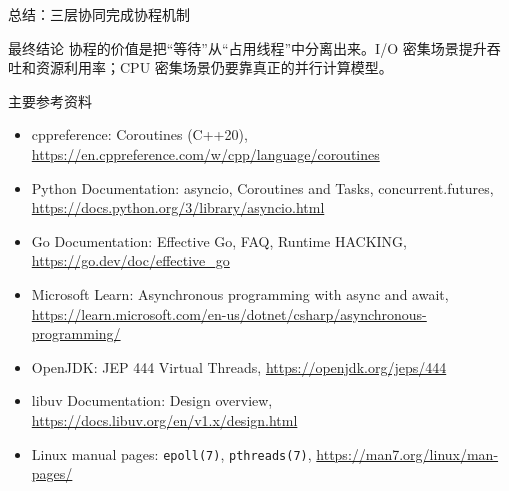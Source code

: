 \documentclass[UTF8,aspectratio=169,11pt]{ctexbeamer}
\begin{document}
\begin{frame}{总结：三层协同完成协程机制}
  \centering

  \vspace{1em}
  \begin{block}{最终结论}
    协程的价值是把“等待”从“占用线程”中分离出来。I/O 密集场景提升吞吐和资源利用率；CPU 密集场景仍要靠真正的并行计算模型。
  \end{block}
\end{frame}

\begin{frame}{主要参考资料}
  \footnotesize
  \begin{itemize}
    \item cppreference: Coroutines (C++20), \url{https://en.cppreference.com/w/cpp/language/coroutines}
    \item Python Documentation: asyncio, Coroutines and Tasks, concurrent.futures, \url{https://docs.python.org/3/library/asyncio.html}
    \item Go Documentation: Effective Go, FAQ, Runtime HACKING, \url{https://go.dev/doc/effective_go}
    \item Microsoft Learn: Asynchronous programming with async and await, \url{https://learn.microsoft.com/en-us/dotnet/csharp/asynchronous-programming/}
    \item OpenJDK: JEP 444 Virtual Threads, \url{https://openjdk.org/jeps/444}
    \item libuv Documentation: Design overview, \url{https://docs.libuv.org/en/v1.x/design.html}
    \item Linux manual pages: \texttt{epoll(7)}, \texttt{pthreads(7)}, \url{https://man7.org/linux/man-pages/}
  \end{itemize}
\end{frame}
\end{document}
